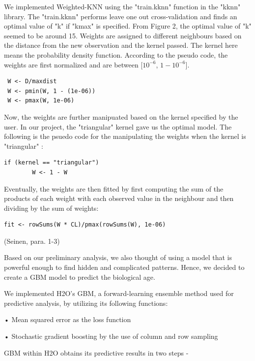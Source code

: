 \documentclass{article}
\begin{document}
We implemented Weighted-KNN using the "train.kknn" function in the "kknn" library. The "train.kknn" performs leave one out cross-validation and finds an optimal value of "k" if "kmax" is specified. From Figure 2, the optimal value of "k" seemed to be around 15. Weights are assigned to different neighbours based on the distance from the new observation and the kernel passed. The kernel here means the probability density function. According to the pseudo code, the weights are first normalized  and are between [$10^{-6}$, $1 - 10^{-6}$]. 


\begin{verbatim}
 W <- D/maxdist
 W <- pmin(W, 1 - (1e-06))
 W <- pmax(W, 1e-06)
\end{verbatim}
 
Now, the weights are further manipuated based on the kernel specified by the user. In our project, the "triangular" kernel gave us the optimal model. The following is the psuedo code for the manipulating the weights when the kernel is "triangular" : 

\begin{verbatim}
if (kernel == "triangular") 
        W <- 1 - W
\end{verbatim}

        
Eventually, the weights are then fitted by first computing the sum of the products of each weight with each observed value in the neighbour and then dividing by the sum of weights:

\begin{verbatim}
fit <- rowSums(W * CL)/pmax(rowSums(W), 1e-06)
\end{verbatim}

(Seinen, para. 1-3)

Based on our preliminary analysis, we also thought of using a model that is powerful enough to find hidden and complicated patterns. Hence, we decided to create a GBM model to predict the biological age. 

We implemented H2O's GBM, a forward-learning ensemble method used for predictive analysis, by utilizing its following functions:

\hspace*{10mm}• Mean squared error as the loss function

\hspace*{10mm}• Stochastic gradient boosting by the use of column and row sampling


GBM within H2O obtains its predictive results in two steps - 
\end{document}
